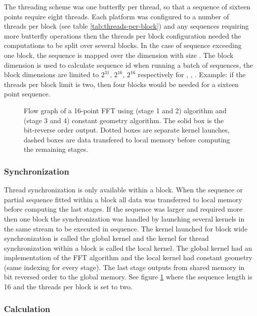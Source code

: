 The threading scheme was one butterfly per thread, so that a sequence of sixteen points require eight threads. Each platform was configured to a number of threads per block (see table \ref{tab:threads-per-block}) and any sequences requiring more butterfly operations then the threads per block configuration needed the computations to be split over several blocks. In the case of sequence exceeding one block, the sequence is mapped over the  dimension with size . The block dimension  is used to calculate sequence id when running a batch of sequences, the block dimensions are limited to $2^{31}$, $2^{16}$, $2^{16}$ respectively for , , . Example: if the threads per block limit is two, then four blocks would be needed for a sixteen point sequence.

\begin{figure}
	
	\caption{Flow graph of a 16-point \gls{FFT} using (stage 1 and 2) {\CTALG} algorithm and (stage 3 and 4) constant geometry algorithm. The solid box is the bit-reverse order output. Dotted boxes are separate kernel launches, dashed boxes are data transfered to local memory before computing the remaining stages.}
	\label{fig:flowgraph-16}
\end{figure}

\subsubsection{Synchronization}

Thread synchronization is only available within a block. When the sequence or partial sequence fitted within a block all data was transferred to local memory before computing the last stages. If the sequence was larger and required more then one block the synchronization was handled by launching several kernels in the same stream to be executed in sequence. The kernel launched for block wide synchronization is called the global kernel and the kernel for thread synchronization within a block is called the local kernel. The global kernel had an implementation of the {\CTALG} \gls{FFT} algorithm and the local kernel had constant geometry (same indexing for every stage). The last stage outputs from shared memory in bit reversed order to the global memory. See figure \ref{fig:flowgraph-16} where the sequence length is 16 and the threads per block is set to two.

\subsubsection{Calculation}

